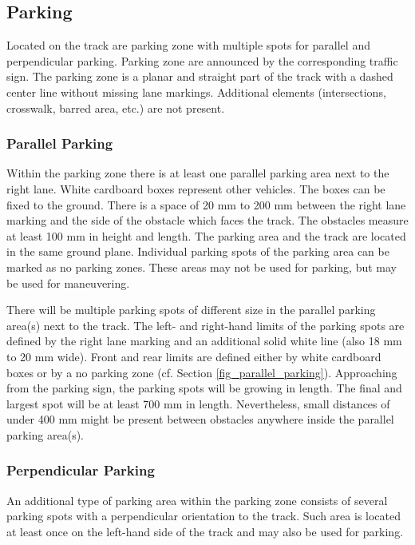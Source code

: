 \subsection{Parking}
\label{parking}

Located on the track are parking zone with multiple spots for parallel and perpendicular parking.
Parking zone are announced by the corresponding traffic sign.
The parking zone is a planar and straight part of the track with a dashed center line without missing lane markings.
Additional elements (intersections, crosswalk, barred area, etc.) are not present.

\subsubsection{Parallel Parking}

Within the parking zone there is at least one parallel parking area next to the right lane.
White cardboard boxes represent other vehicles.
The boxes can be fixed to the ground.
There is a space of 20 mm to 200 mm between the right lane marking and the side of the obstacle which faces the track.
The obstacles measure at least 100 mm in height and length.
The parking area and the track are located in the same ground plane.
Individual parking spots of the parking area can be marked as no parking zones.
These areas may not be used for parking, but may be used for maneuvering.

There will be multiple parking spots of different size in the parallel parking area(s) next to the track.
The left- and right-hand limits of the parking spots are defined by the right lane marking and an additional solid white line (also 18 mm to 20 mm wide).
Front and rear limits are defined either by white cardboard boxes or by a no parking zone (cf. Section \ref{fig_parallel_parking}).
Approaching from the parking sign, the parking spots will be growing in length.
The final and largest spot will be at least 700 mm in length.
Nevertheless, small distances of under 400 mm might be present between obstacles anywhere inside the parallel parking area(s).

\subsubsection{Perpendicular Parking}

An additional type of parking area within the parking zone consists of several parking spots with a perpendicular orientation to the track.
Such area is located at least once on the left-hand side of the track and may also be used for parking.

